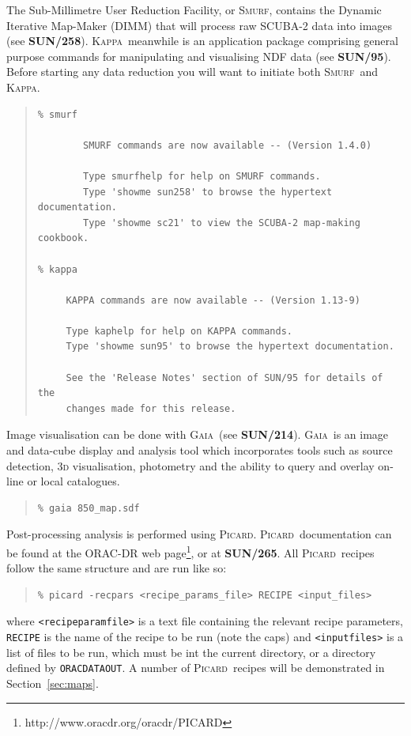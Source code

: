 \documentclass[twoside,11pt]{article}
\newcommand{\htmladdnormallinkfoot}[2]{#1\footnote{#2}}
\newcommand{\xref}[3]{#1}
\renewcommand{\_}{\texttt{\symbol{95}}}
\newenvironment{myquote}{\begin{quote}\begin{small}}{\end{small}\end{quote}}
\newcommand{\gaia}{\xref{\textsc{Gaia}}{sun214}{}}
\newcommand{\Kappa}{\xref{\textsc{Kappa}}{sun95}{}}
\newcommand{\picard}{\xref{\textsc{Picard}}{sun265}{}}
\newcommand{\smurf}{\xref{\textsc{Smurf}}{sun258}{}}
\newcommand{\param}[1]{\texttt{#1}}
\newcommand{\gaiasun}{\xref{\textbf{SUN/214}}{sun214}{}}
\newcommand{\kappasun}{\xref{\textbf{SUN/95}}{sun95}{}}
\newcommand{\picardsun}{\xref{\textbf{SUN/265}}{sun265}{}}
\newcommand{\smurfsun}{\xref{\textbf{SUN/258}}{sun258}{}}
\begin{document}
The Sub-Millimetre User Reduction Facility, or \smurf, contains the
Dynamic Iterative Map-Maker (DIMM) that will process raw SCUBA-2 data
into images (see \smurfsun). \Kappa\ meanwhile is an application
package comprising general purpose commands for manipulating and
visualising NDF data (see \kappasun). Before starting any data
reduction you will want to initiate both \smurf\ and \Kappa.
\begin{myquote}
\begin{verbatim}
% smurf

        SMURF commands are now available -- (Version 1.4.0)

        Type smurfhelp for help on SMURF commands.
        Type 'showme sun258' to browse the hypertext documentation.
        Type 'showme sc21' to view the SCUBA-2 map-making cookbook.

% kappa

     KAPPA commands are now available -- (Version 1.13-9)

     Type kaphelp for help on KAPPA commands.
     Type 'showme sun95' to browse the hypertext documentation.

     See the 'Release Notes' section of SUN/95 for details of the
     changes made for this release.
\end{verbatim}
\end{myquote}
Image visualisation can be done with \gaia\ (see \gaiasun). \gaia\ is an
image and data-cube display and analysis tool which incorporates tools such
as source detection, 3\textsc{d} visualisation, photometry and the ability
to query and overlay on-line or local catalogues.
\begin{myquote}
\begin{verbatim}
% gaia 850_map.sdf
\end{verbatim}
\end{myquote}

Post-processing analysis is performed using \picard. \picard\ documentation can be
found at \htmladdnormallinkfoot{the ORAC-DR web page}{http://www.oracdr.org/oracdr/PICARD},
or at \picardsun. All \picard\ recipes follow the same structure and are run like so:
\begin{myquote}
\begin{verbatim}
% picard -recpars <recipe_params_file> RECIPE <input_files>
\end{verbatim}
\end{myquote}
where \param{<recipe\_param\_file>} is a text file containing the
relevant recipe parameters, \param{RECIPE} is the name of the recipe
to be run (note the caps) and \param{<input\_files>} is a list of
files to be run, which must be int the current directory, or a
directory defined by \param{ORAC\_DATA\_OUT}. A number of \picard\
recipes will be demonstrated in Section~\ref{sec:maps}.
\end{document}
